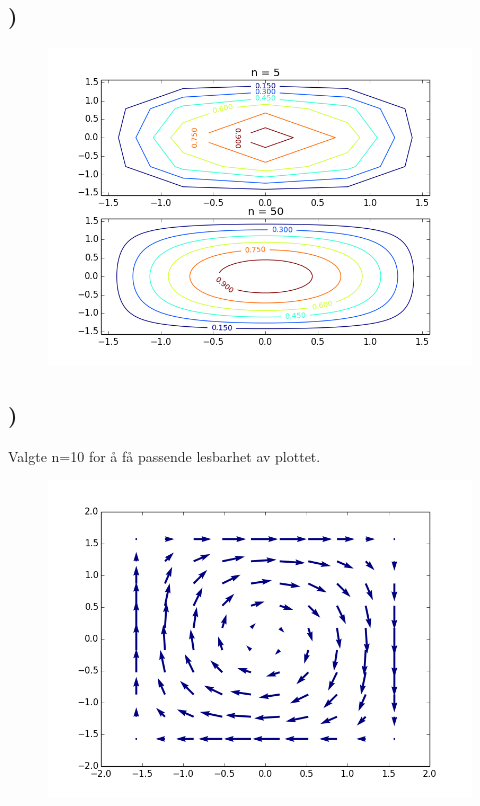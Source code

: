 \documentclass[a4paper,10pt,norsk]{article}
\begin{document}
\section{}

\subsection{)}

\begin{figure}[h!]
        \centering 
        \includegraphics[scale=0.7]{strlin.png} 
\end{figure}



\pagebreak

\subsection{)}

Valgte n=10 for å få passende lesbarhet av plottet.

\begin{figure}[h!]
        \centering 
        \includegraphics[scale=0.7]{velfield.png} 
\end{figure}




\end{document}
